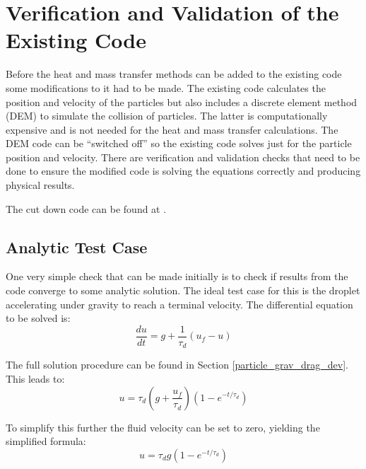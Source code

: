 \documentclass[../Interim_Report_Master]{subfiles}
\begin{document}
\hypertarget{v_and_v}{\section{Verification and Validation of the Existing Code}\label{v_and_v}}
Before the heat and mass transfer methods can be added to the existing code some modifications to it had to be made. The existing code calculates the position and velocity of the particles but also includes a discrete element method (DEM) to simulate the collision of particles. The latter is computationally expensive and is not needed for the heat and mass transfer calculations. The DEM code can be ``switched off'' so the existing code solves just for the particle position and velocity. There are verification and validation checks that need to be done to ensure the modified code is solving the equations correctly and producing physical results.

The cut down code can be found at \cite{andrew_oranges}. 

\subsection{Analytic Test Case}\label{an_test}
One very simple check that can be made initially is to check if results from the code converge to some analytic solution. The ideal test case for this is the droplet accelerating under gravity to reach a terminal velocity. The differential equation to be solved is:
\begin{equation}
\frac{du}{dt} = g + \frac{1}{\tau_d}(u_f-u)
\end{equation}

The full solution procedure can be found in Section \ref{particle_grav_drag_dev}. This leads to:
\begin{equation}
u = \tau_d\left(g + \frac{u_f}{\tau_d}\right)(1-e^{-t/\tau_d})
\end{equation}

To simplify this further the fluid velocity can be set to zero, yielding the simplified formula: 
\begin{equation}
u = \tau_d g(1-e^{-t/\tau_d})
\end{equation}
\end{document}
